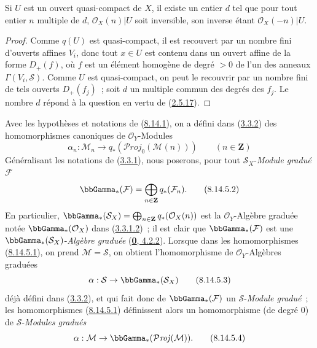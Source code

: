\begin{proposition}[8.14.4]
\label{II.8.14.4-fr}
Si $U$ est un ouvert quasi-compact de $X$, il existe un entier $d$ tel que
pour tout entier $n$ multiple de $d$, $\mathcal{O}_X(n)|U$ soit inversible,
son inverse étant $\mathcal{O}_X(-n)|U$.
\end{proposition}

\begin{proof}
Comme $q(U)$ est quasi-compact, il est recouvert par un nombre fini d'ouverts
affines $V_i$, donc tout $x\in U$ est contenu dans un ouvert affine de la
forme $D_+(f)$, où $f$ est un élément homogène de degré $>0$ de l'un des
anneaux $\Gamma(V_i,\mathcal{S})$. Comme $U$ est quasi-compact, on peut le
recouvrir par un nombre fini de tels ouverts $D_+(f_j)$~; soit $d$ un
multiple commun des degrés des $f_j$. Le nombre $d$ répond à la question en
vertu de (\hyperref[II.2.5.17-fr]{2.5.17}).
\end{proof}

\begin{env}[8.14.5]
\label{II.8.14.5-fr}
Avec les hypothèses et notations de (\hyperref[II.8.14.1-fr]{8.14.1}), on a
défini dans (\hyperref[II.3.3.2-fr]{3.3.2}) des homomorphismes canoniques de
$\mathcal{O}_Y$-Modules
\begin{equation}
\label{II.8.14.5.1-fr}
  \alpha_n:\mathcal{M}_n\to
  q_*(\mathcal{P}\mathit{roj}_0(\mathcal{M}(n)))
  \qquad(n\in\mathbf{Z})
\tag{8.14.5.1}
\end{equation}
Généralisant les notations de (\hyperref[II.3.3.1-fr]{3.3.1}), nous
poserons, pour tout $\mathcal{S}_X$-\emph{Module gradué} $\mathcal{F}$
\begin{equation}
\label{II.8.14.5.2-fr}
  \bbGamma_*(\mathcal{F})=
  \bigoplus_{n\in\mathbf{Z}}q_*(\mathcal{F}_n).
\tag{8.14.5.2}
\end{equation}
En particulier,
$\bbGamma_*(\mathcal{S}_X)=\bigoplus_{n\in\mathbf{Z}}q_*(\mathcal{O}_X(n))$
est la $\mathcal{O}_Y$-Algèbre graduée notée
$\bbGamma_*(\mathcal{O}_X)$ dans
(\hyperref[II.3.3.1.2-fr]{3.3.1.2})~; il est clair que
$\bbGamma_*(\mathcal{F})$ est une $\bbGamma_*(\mathcal{S}_X)$-\emph{Algèbre graduée}
(\hyperref[0.4.2.2-fr]{\textbf{0}, 4.2.2}). Lorsque
dans les homomorphismes (\hyperref[II.8.14.5.1-fr]{8.14.5.1}), on prend
$\mathcal{M}=\mathcal{S}$, on obtient l'homomorphisme de
$\mathcal{O}_Y$-Algèbres graduées
\begin{equation}
\label{II.8.14.5.3-fr}
  \alpha:\mathcal{S}\to\bbGamma_*(\mathcal{S}_X)
\tag{8.14.5.3}
\end{equation}
déjà défini dans (\hyperref[II.3.3.2-fr]{3.3.2}), et qui fait donc de
$\bbGamma_*(\mathcal{F})$ un $\mathcal{S}$-\emph{Module gradué}~; les homomorphismes
(\hyperref[II.8.14.5.1-fr]{8.14.5.1}) définissent alors un homomorphisme (de
degré $0$) de $\mathcal{S}$-\emph{Modules gradués}
\begin{equation}
\label{II.8.14.5.4-fr}
  \alpha:\mathcal{M}\to\bbGamma_*(\mathcal{P}\mathit{roj}(\mathcal{M})).
\tag{8.14.5.4}
\end{equation}
\end{env}

